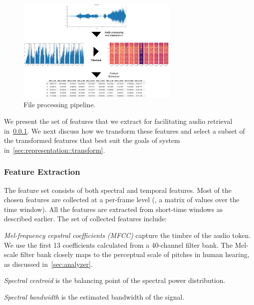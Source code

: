 \begin{figure}[t]
    \centering
    \includegraphics[width=0.7\textwidth]{figures/processing-pipeline.png}
    \caption{File processing pipeline.}
    \label{fig:my-label}
\end{figure}

We present the set of features that we extract for facilitating audio retrieval
in~\cref{sec:representation::extraction}.
%
We next discuss how we transform these features and select a subset of the
transformed features that best suit the goals of system
in~\cref{sec:representation::transform}.

\subsubsection{Feature Extraction}
\label{sec:representation::extraction}

The feature set consists of both spectral and temporal features. 
%
Most of the chosen features are collected at a per-frame level (\ie, 
a matrix of values over the time window). 
%
All the features are extracted from short-time windows as described earlier.
%
The set of collected features include:

\squishitemize

\item \textit{Mel-frequency cepstral coefficients (MFCC)} capture the timbre
of the audio token. 
%
We use the first 13 coefficients calculated from a 40-channel filter bank.
%
The Mel-scale filter bank closely maps to the perceptual scale of pitches in
human hearing, as discussed in~\cref{sec:analyzer}. 

\item \textit{Spectral centroid} is the balancing point of the spectral power
distribution.

\item \textit{Spectral bandwidth} is the estimated bandwidth of the signal.

